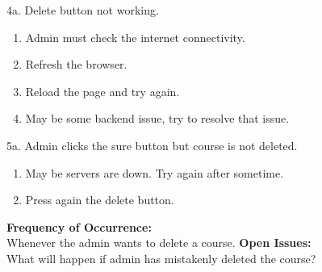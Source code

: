 \documentclass[12pt]{article}
\begin{document}
4a. Delete button not working.
\begin{enumerate}
\item Admin must check the internet connectivity.
\item Refresh the browser.
\item Reload the page and try again.
\item May be some backend issue, try to resolve that issue.
\end{enumerate}
5a. Admin clicks the sure button but course is not deleted.
\begin{enumerate}
\item May be servers are down. Try again after sometime.
\item Press again the delete button.
\end{enumerate}
\textbf{Frequency of Occurrence:}\\
Whenever the admin wants to delete a course.
\textbf{Open Issues:}\\
What will happen if admin has mistakenly deleted the course?
\end{document}
